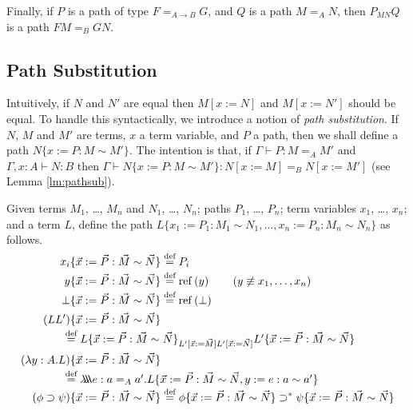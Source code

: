 \documentclass[a4paper,UKenglish]{lipics-v2016}
\newcommand*{\eqdef}{\mathrel{\smash{\stackrel{\text{def}}{=}}}}
\newcommand*{\reff}[1]{\ensuremath{\mathrm{ref} \left( {#1} \right)}}
\newcommand*{\triplelambda}{\ensuremath{\lambda \!\! \lambda \!\! \lambda}}
\theoremstyle{definition}
\begin{document}
Finally, if $P$ is a path of type $F =_{A \rightarrow B} G$, and $Q$ is a path $M =_A N$, then $P_{MN} Q$ is a path $FM =_B G N$.

\subsection{Path Substitution}

Intuitively, if $N$ and $N'$ are equal then $M[x:=N]$ and $M[x:=N']$ should be equal.  To handle this syntactically,
we introduce a notion of \emph{path substitution}.  If $N$, $M$ and $M'$ are terms, $x$ a term variable, and $P$ a path, then we shall define a path $N \{ x := P : M \sim M' \}$.  The intention is that, if
$\Gamma \vdash P : M =_A M'$ and $\Gamma, x : A \vdash N : B$ then $\Gamma \vdash N \{ x := P : M \sim M' \} : N [ x:= M ] =_B N [ x := M' ]$ (see Lemma \ref{lm:pathsub}). 

\begin{definition}
Given terms $M_1$, \ldots, $M_n$ and $N_1$, \ldots, $N_n$; paths $P_1$, \ldots, $P_n$; term variables $x_1$, \ldots, $x_n$; and a term $L$, define the path $L \{ x_1 := P_1 : M_1 \sim N_1 , \ldots, x_n := P_n : M_n \sim N_n \}$ as follows.
\begin{align*}
x_i \{ \vec{x} := \vec{P} : \vec{M} \sim \vec{N} \} & \eqdef P_i \\
y \{ \vec{x} := \vec{P} : \vec{M} \sim \vec{N} \} & \eqdef \reff{y} \qquad (y \not\equiv x_1, \ldots, x_n) \\
\bot \{ \vec{x} := \vec{P} : \vec{M} \sim \vec{N} \} & \eqdef \reff{\bot} \\
(LL') \{ \vec{x} := \vec{P} : \vec{M} \sim \vec{N} \} \\
\omit\rlap{\qquad \qquad $\eqdef L \{ \vec{x} := \vec{P} : \vec{M} \sim \vec{N} \}_{L' [\vec{x} := \vec{M}] L' [\vec{x} := \vec{N}]} L' \{ \vec{x} := \vec{P} : \vec{M} \sim \vec{N} \}$} \\
(\lambda y:A.L) \{ \vec{x} := \vec{P} : \vec{M} \sim \vec{N} \} & \\
\omit\rlap{\qquad\qquad $\eqdef \triplelambda e : a =_A a' . L \{ \vec{x} := \vec{P} : \vec{M} \sim \vec{N} , y := e : a \sim a' \}$} \\
(\phi \supset \psi) \{ \vec{x} := \vec{P} : \vec{M} \sim \vec{N} \} & \eqdef \phi \{ \vec{x} := \vec{P} : \vec{M} \sim \vec{N} \} \supset^* \psi \{ \vec{x} := \vec{P} : \vec{M} \sim \vec{N} \}
\end{align*}
\end{definition}
\end{document}
